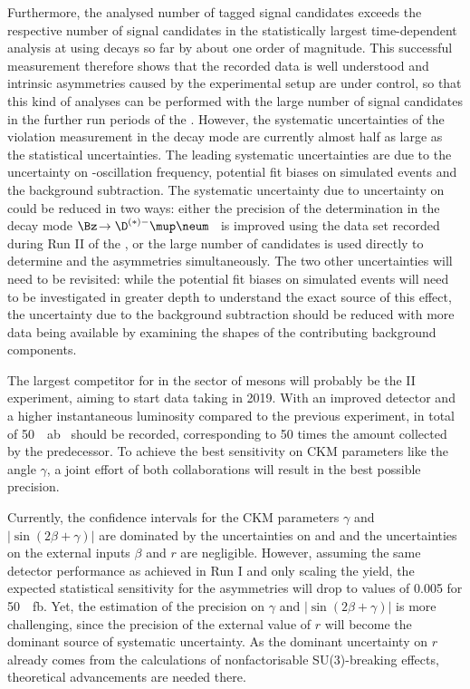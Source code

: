 Furthermore, the analysed number of tagged signal candidates exceeds the respective number of signal candidates in the statistically largest time-dependent \CP analysis at \lhcb using \BdToJPsiKS decays so far by about one order of magnitude.
This successful measurement therefore shows that the recorded data is well understood and intrinsic asymmetries caused by \eg the experimental setup are under control, so that this kind of analyses can be performed with the large number of signal candidates in the further run periods of the \lhc.
However, the systematic uncertainties of the \CP violation measurement in the decay mode \mbox{\BdToDpi} are currently almost half as large as the statistical uncertainties.
The leading systematic uncertainties are due to the uncertainty on \Bz-oscillation frequency, potential fit biases on simulated events and the background subtraction.
The systematic uncertainty due to uncertainty on \dm could be reduced in two ways: either the precision of the determination in the decay mode \mbox{$\Bz\!\to\D^{(*)-}\mup\neum$}~\cite{Aaij:2016fdk} is improved using the data set recorded during Run II of the \lhc, or the large number of \BdToDpi candidates is used directly to determine \dm and the \CP asymmetries simultaneously.
The two other uncertainties will need to be revisited: while the potential fit biases on simulated events will need to be investigated in greater depth to understand the exact source of this effect, the uncertainty due to the background subtraction should be reduced with more data being available by examining the shapes of the contributing background components.

The largest competitor for \lhcb in the sector of \B mesons will probably be the \belle II experiment, aiming to start data taking in \num{2019}.
With an improved detector and a higher instantaneous luminosity compared to the previous \belle experiment, in total of \SI{50}{\per\atto\barn}~\cite{Abe:2010gxa} should be recorded, corresponding to \num{50} times the amount collected by the predecessor.
To achieve the best sensitivity on CKM parameters like the angle $\gamma$, a joint effort of both collaborations will result in the best possible precision.

Currently, the confidence intervals for the CKM parameters $\gamma$ and $\left|\sin\!\left(2\beta+\gamma\right)\right|$ are dominated by the uncertainties on \Sf and \Sfbar and the uncertainties on the external inputs $\beta$ and $r$ are negligible.
However, assuming the same detector performance as achieved in Run I and only scaling the \BdToDpi yield, the expected statistical sensitivity for the \CP asymmetries will drop to values of \eg \num{0.005} for \SI{50}{\per\femto\barn}.
Yet, the estimation of the precision on $\gamma$ and $\left|\sin\!\left(2\beta+\gamma\right)\right|$ is more challenging, since the precision of the external value of $r$ will become the dominant source of systematic uncertainty. As the dominant uncertainty on $r$ already comes from the calculations of nonfactorisable SU(3)-breaking effects, theoretical advancements are needed there.
